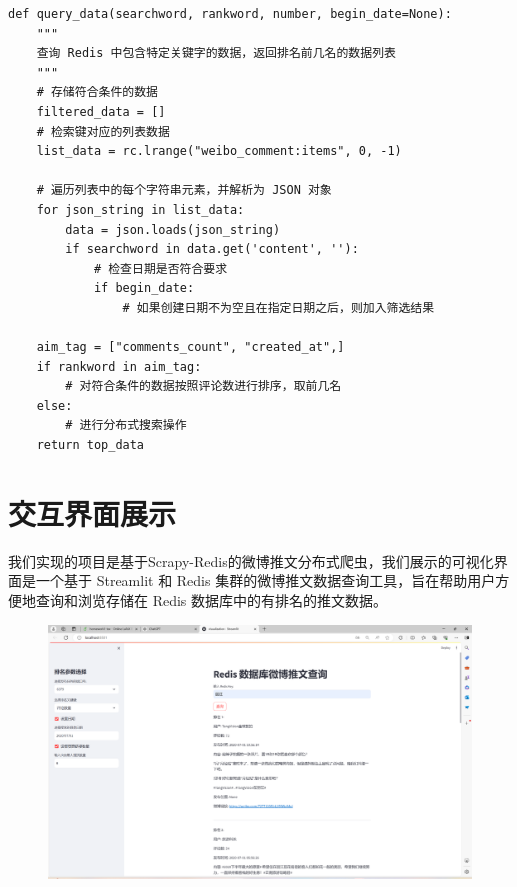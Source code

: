 \documentclass[12pt,hyperref,a4paper,UTF8]{ctexart}
\begin{document}
\begin{verbatim}
def query_data(searchword, rankword, number, begin_date=None):
    """
    查询 Redis 中包含特定关键字的数据，返回排名前几名的数据列表
    """
    # 存储符合条件的数据
    filtered_data = []
    # 检索键对应的列表数据
    list_data = rc.lrange("weibo_comment:items", 0, -1)
    
    # 遍历列表中的每个字符串元素，并解析为 JSON 对象
    for json_string in list_data:
        data = json.loads(json_string)
        if searchword in data.get('content', ''):
            # 检查日期是否符合要求
            if begin_date:
                # 如果创建日期不为空且在指定日期之后，则加入筛选结果

    aim_tag = ["comments_count", "created_at",]
    if rankword in aim_tag:
        # 对符合条件的数据按照评论数进行排序，取前几名
    else:
        # 进行分布式搜索操作
    return top_data
\end{verbatim} 

\section{交互界面展示}

我们实现的项目是基于Scrapy-Redis的微博推文分布式爬虫，我们展示的可视化界面是一个基于 Streamlit 和 Redis 集群的微博推文数据查询工具，旨在帮助用户方便地查询和浏览存储在 Redis 数据库中的有排名的推文数据。

\begin{figure}[H]
\centering
\includegraphics[width=1\textwidth]{figures/lijiang.png}
\end{figure}
\end{document}
